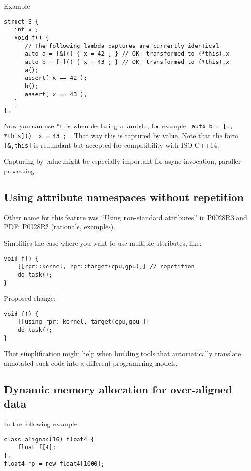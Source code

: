 Example:
\begin{verbatim}
struct S {
   int x ;
   void f() {
      // The following lambda captures are currently identical
      auto a = [&]() { x = 42 ; } // OK: transformed to (*this).x
      auto b = [=]() { x = 43 ; } // OK: transformed to (*this).x
      a();
      assert( x == 42 );
      b();
      assert( x == 43 );
   }
};
\end{verbatim}

Now you can use *this when declaring a lambda, for example \texttt{ auto b = [=, *this]() { x = 43 ; }}. That way this is captured by value. Note that the form \texttt{[&,this]} is redundant but accepted for compatibility with ISO C++14.

Capturing by value might be especially important for async invocation, paraller processing.

\subsection{Using attribute namespaces without repetition}

Other name for this feature was “Using non-standard attributes” in P0028R3 and PDF: P0028R2 (rationale, examples).

Simplifies the case where you want to use multiple attributes, like:

\begin{verbatim}
void f() {
    [[rpr::kernel, rpr::target(cpu,gpu)]] // repetition
    do-task();
}
\end{verbatim}

Proposed change:

\begin{verbatim}
void f() {
    [[using rpr: kernel, target(cpu,gpu)]]
    do-task();
}
\end{verbatim}

That simplification might help when building tools that automatically translate annotated such code into a different programming models.

\subsection{Dynamic memory allocation for over-aligned data}

In the following example:
\begin{verbatim}
class alignas(16) float4 {
    float f[4];
};
float4 *p = new float4[1000];
\end{verbatim}

